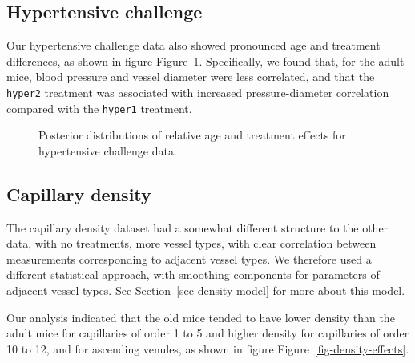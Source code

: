 \documentclass[
  letterpaper,
  DIV=11,
  numbers=noendperiod,
  oneside]{scrartcl}
\theoremstyle{plain}
\theoremstyle{remark}
\begin{document}
\subsection{Hypertensive challenge}\label{hypertensive-challenge}

Our hypertensive challenge data also showed pronounced age and treatment
differences, as shown in figure Figure~\ref{fig-hypertension-effects}.
Specifically, we found that, for the adult mice, blood pressure and
vessel diameter were less correlated, and that the \texttt{hyper2}
treatment was associated with increased pressure-diameter correlation
compared with the \texttt{hyper1} treatment.

\begin{figure}


\caption{\label{fig-hypertension-effects}Posterior distributions of
relative age and treatment effects for hypertensive challenge data.}

\end{figure}%

\subsection{Capillary density}\label{capillary-density}

The capillary density dataset had a somewhat different structure to the
other data, with no treatments, more vessel types, with clear
correlation between measurements corresponding to adjacent vessel types.
We therefore used a different statistical approach, with smoothing
components for parameters of adjacent vessel types. See
Section~\ref{sec-density-model} for more about this model.

Our analysis indicated that the old mice tended to have lower density
than the adult mice for capillaries of order 1 to 5 and higher density
for capillaries of order 10 to 12, and for ascending venules, as shown
in figure Figure~\ref{fig-density-effects}.
\end{document}
